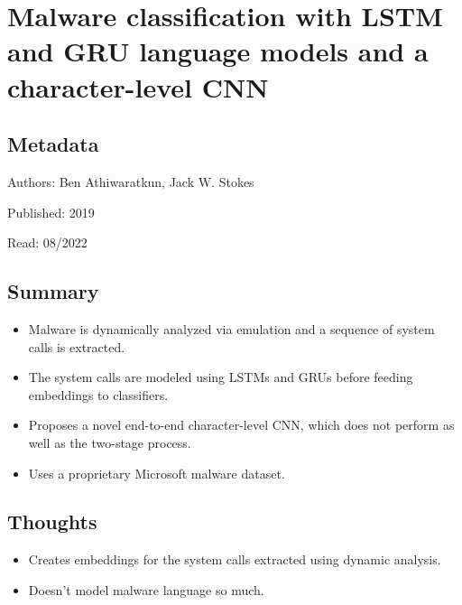 \documentclass{article}
\begin{document}
\pagebreak


\section*{Malware classification with LSTM and GRU language models and a character-level CNN}

\subsection*{Metadata}

\noindent Authors: Ben Athiwaratkun, Jack W. Stokes

\noindent Published: 2019

\noindent Read: 08/2022

\subsection*{Summary}
\begin{itemize}
\item Malware is dynamically analyzed via emulation and a sequence of system calls is extracted.
\item The system calls are modeled using LSTMs and GRUs before feeding embeddings to classifiers.
\item Proposes a novel end-to-end character-level CNN, which does not perform as well as the two-stage process.
\item Uses a proprietary Microsoft malware dataset.
\end{itemize}

\subsection*{Thoughts}
\begin{itemize}
\item Creates embeddings for the system calls extracted using dynamic analysis.
\item Doesn't model malware language so much.
\end{itemize}
\end{document}
